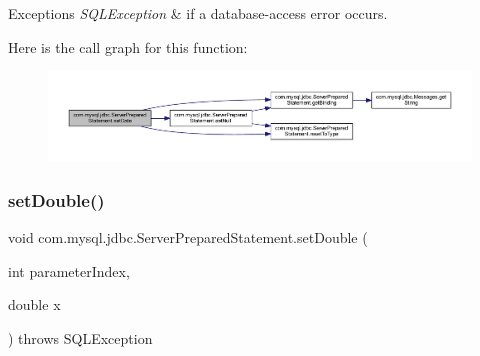 \begin{DoxyExceptions}{Exceptions}
{\em S\+Q\+L\+Exception} & if a database-\/access error occurs. \\
\hline
\end{DoxyExceptions}
Here is the call graph for this function\+:
\nopagebreak
\begin{figure}[H]
\begin{center}
\leavevmode
\includegraphics[width=350pt]{classcom_1_1mysql_1_1jdbc_1_1_server_prepared_statement_a00373006ec942cdbf2a59a4be5855067_cgraph}
\end{center}
\end{figure}
\mbox{\label{classcom_1_1mysql_1_1jdbc_1_1_server_prepared_statement_a50bb9137b1cec3fbff1140ed19785841}} 
\subsubsection{\texorpdfstring{set\+Double()}{setDouble()}}
{\footnotesize\ttfamily void com.\+mysql.\+jdbc.\+Server\+Prepared\+Statement.\+set\+Double (\begin{DoxyParamCaption}\item[{int}]{parameter\+Index,  }\item[{double}]{x }\end{DoxyParamCaption}) throws S\+Q\+L\+Exception}

